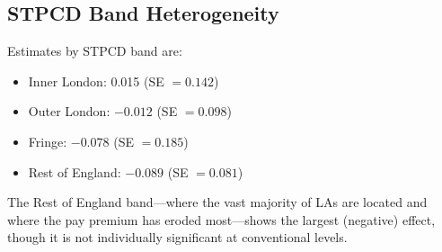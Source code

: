 \documentclass[12pt]{article}
\begin{document}
\subsection{STPCD Band Heterogeneity}

Estimates by STPCD band are:
\begin{itemize}
\item Inner London: 0.015 (SE $= 0.142$)
\item Outer London: $-0.012$ (SE $= 0.098$)
\item Fringe: $-0.078$ (SE $= 0.185$)
\item Rest of England: $-0.089$ (SE $= 0.081$)
\end{itemize}

The Rest of England band---where the vast majority of LAs are located and where the pay premium has eroded most---shows the largest (negative) effect, though it is not individually significant at conventional levels.
\end{document}
